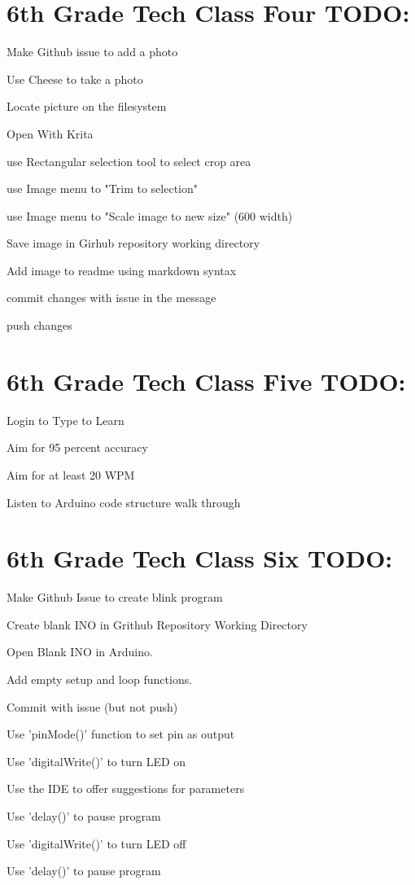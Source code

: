 \documentclass{article}
\begin{document}
\section{6th Grade Tech Class Four TODO:}
\begin{todolist}
	\item Make  Github issue to add a photo
	\item Use Cheese to take a photo
	\item Locate picture on the filesystem
	\item Open With Krita
	\item use Rectangular selection tool to select crop area
	\item use Image menu to "Trim to selection"
	\item use Image menu to "Scale image to new size" (600 width) 
	\item Save image in Girhub repository working directory
	\item Add image to readme using markdown syntax
	\item commit changes with issue in the message
	\item push changes
\end{todolist}

\section{6th Grade Tech Class Five TODO:}
\begin{todolist}
	\item Login to Type to Learn
	\item Aim for 95 percent accuracy
	\item Aim for at least 20 WPM
	\item Listen to Arduino code structure walk through
\end{todolist}

\section{6th Grade Tech Class Six TODO:}
\begin{todolist}
	\item Make Github Issue to create blink program
	\item Create blank INO in Grithub Repository Working Directory
	\item Open Blank INO in Arduino.
	\item Add empty setup and loop functions.
	\item Commit with issue (but not push)
	\item Use 'pinMode()' function to set pin as output
	\item Use 'digitalWrite()' to turn LED on
	\item Use the IDE to offer suggestions for parameters
	\item Use 'delay()' to pause program
	\item Use 'digitalWrite()' to turn LED off
	\item Use 'delay()' to pause program
\end{todolist}
\newpage
\end{document}
